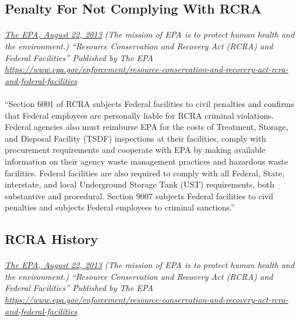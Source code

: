 \documentclass{article}
\begin{document}
\subsection{Penalty For Not Complying With RCRA}
\paragraph{}
\small
\textit{
\underline{The EPA, August 22, 2013}
(The mission of EPA is to protect human health and the environment.) “Resource Conservation and Recovery Act (RCRA) and Federal Facilities” Published by The EPA
\url{https://www.epa.gov/enforcement/resource-conservation-and-recovery-act-rcra-and-federal-facilities}}
\normalsize

\paragraph{}
``Section 6001 of RCRA subjects Federal facilities to civil penalties and confirms that Federal employees are personally liable for RCRA criminal violations. Federal agencies also must reimburse EPA for the costs of Treatment, Storage, and Disposal Facility (TSDF) inspections at their facilities, comply with procurement requirements and cooperate with EPA by making available information on their agency waste management practices and hazardous waste facilities. Federal facilities are also required to comply with all Federal, State, interstate, and local Underground Storage Tank (UST) requirements, both substantive and procedural. Section 9007 subjects Federal facilities to civil penalties and subjects Federal employees to criminal sanctions.”

\subsection{RCRA History}
\paragraph{}
\small
\textit{
\underline{The EPA, August 22, 2013}
(The mission of EPA is to protect human health and the environment.) “Resource Conservation and Recovery Act (RCRA) and Federal Facilities” Published by The EPA
\url{https://www.epa.gov/enforcement/resource-conservation-and-recovery-act-rcra-and-federal-facilities}}
\normalsize
\end{document}
